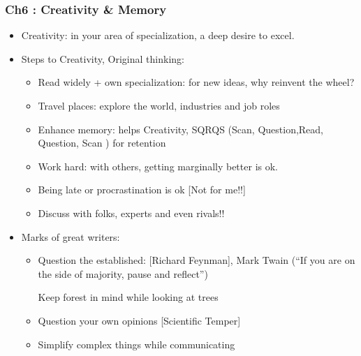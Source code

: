 \begin{frame}[fragile]\frametitle{Ch6 : Creativity \& Memory}

\begin{itemize}
\item Creativity: in your area of specialization, a deep desire to excel. 
\item Steps to Creativity, Original thinking:
	\begin{itemize}
	\item Read widely + own specialization: for new ideas, why reinvent the wheel?
	\item Travel places:  explore the world, industries and job roles
	\item Enhance memory: helps Creativity, SQRQS (Scan, Question,Read, Question, Scan ) for retention
	\item Work hard: with others, getting marginally better is ok.
	\item Being late or procrastination is ok [Not for me!!]
	\item Discuss with folks, experts and even rivals!!
	\end{itemize}
\item Marks of great writers:
	\begin{itemize}
	\item Question the established: [Richard Feynman], Mark Twain (``If you are on the side of majority, pause and reflect'')
	\item [Keep forest in mind while looking at trees]
	\item Question your own opinions [Scientific Temper]
	\item Simplify complex things while communicating
	\end{itemize}

\end{itemize}

\end{frame}

